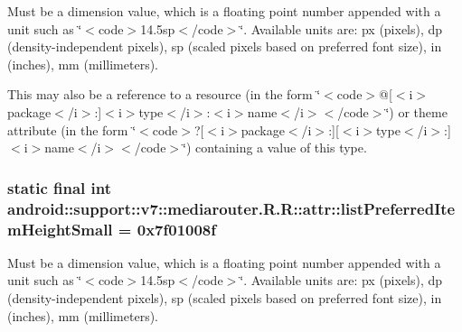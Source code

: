 Must be a dimension value, which is a floating point number appended with a unit such as \char`\"{}$<$code$>$14.5sp$<$/code$>$\char`\"{}. Available units are: px (pixels), dp (density-independent pixels), sp (scaled pixels based on preferred font size), in (inches), mm (millimeters). 

This may also be a reference to a resource (in the form \char`\"{}$<$code$>$@\mbox{[}$<$i$>$package$<$/i$>$:\mbox{]}$<$i$>$type$<$/i$>$:$<$i$>$name$<$/i$>$$<$/code$>$\char`\"{}) or theme attribute (in the form \char`\"{}$<$code$>$?\mbox{[}$<$i$>$package$<$/i$>$:\mbox{]}\mbox{[}$<$i$>$type$<$/i$>$:\mbox{]}$<$i$>$name$<$/i$>$$<$/code$>$\char`\"{}) containing a value of this type. \hypertarget{classandroid_1_1support_1_1v7_1_1mediarouter_1_1_r_1_1attr_5ac2ae0b3b03b3b454f67affebbd15c7}{
\subsubsection[{listPreferredItemHeightSmall}]{\setlength{\rightskip}{0pt plus 5cm}static final int android::support::v7::mediarouter.R.R::attr::listPreferredItemHeightSmall = 0x7f01008f}}
\label{classandroid_1_1support_1_1v7_1_1mediarouter_1_1_r_1_1attr_5ac2ae0b3b03b3b454f67affebbd15c7}


Must be a dimension value, which is a floating point number appended with a unit such as \char`\"{}$<$code$>$14.5sp$<$/code$>$\char`\"{}. Available units are: px (pixels), dp (density-independent pixels), sp (scaled pixels based on preferred font size), in (inches), mm (millimeters). 

